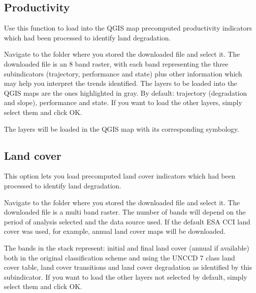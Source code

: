 \documentclass[letterpaper,10pt,english]{sphinxmanual}
\begin{document}
\subsection{Productivity}
\label{\detokenize{Qgis_Plugin/load_data:productivity}}
\sphinxAtStartPar
Use this function to load into the QGIS map pre\sphinxhyphen{}computed productivity indicators which had been
processed to identify land degradation.

\sphinxAtStartPar
Navigate to the folder where you stored the downloaded file and select it. The downloaded file is an 8 band raster,
with each band representing the three subindicators (trajectory, performance and state) plus other information which may
help you interpret the trends identified. The layers to be loaded into the QGIS maps are the ones highlighted in gray. By default: trajectory
(degradation and slope), performance and state. If you want to load the other layers, simply select them and click OK.


\sphinxAtStartPar
The layers will be loaded in the QGIS map with its corresponding symbology.



\subsection{Land cover}
\label{\detokenize{Qgis_Plugin/load_data:land-cover}}
\sphinxAtStartPar
This option lets you load pre\sphinxhyphen{}computed land cover indicators which had been
processed to identify land degradation.

\sphinxAtStartPar
Navigate to the folder where you stored the downloaded file and select it. The downloaded file is a multi band raster. The number
of bands will depend on the period of analysis selected and the data source used. If the default ESA CCI land cover was used, for example,
annual land cover maps will be downloaded.

\sphinxAtStartPar
The bands in the stack represent: initial and final land cover (annual if available) both in the original classification scheme and using
the UNCCD 7 class land cover table, land cover transitions and land cover degradation as
identified by this subindicator. If you want to load the other layers not selected by default, simply select them and click OK.
\end{document}

